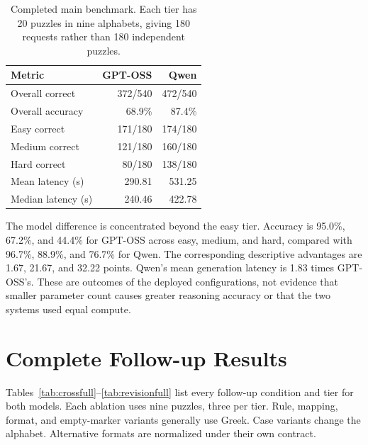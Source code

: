 \documentclass[11pt]{article}
\begin{document}
\begin{table}[t]
\centering\small
\begin{tabular}{lrr}
\toprule
Metric & GPT-OSS & Qwen\\
\midrule
Overall correct & 372/540 & 472/540\\
Overall accuracy & 68.9\% & 87.4\%\\
Easy correct & 171/180 & 174/180\\
Medium correct & 121/180 & 160/180\\
Hard correct & 80/180 & 138/180\\
Mean latency (s) & 290.81 & 531.25\\
Median latency (s) & 240.46 & 422.78\\
\bottomrule
\end{tabular}
\caption{Completed main benchmark. Each tier has 20 puzzles in nine alphabets, giving 180 requests rather than 180 independent puzzles.}
\label{tab:main}
\end{table}

The model difference is concentrated beyond the easy tier. Accuracy is 95.0\%, 67.2\%, and 44.4\% for GPT-OSS across easy, medium, and hard, compared with 96.7\%, 88.9\%, and 76.7\% for Qwen. The corresponding descriptive advantages are 1.67, 21.67, and 32.22 points. Qwen's mean generation latency is 1.83 times GPT-OSS's. These are outcomes of the deployed configurations, not evidence that smaller parameter count causes greater reasoning accuracy or that the two systems used equal compute.

\section{Complete Follow-up Results}\label{app:followups}
Tables~\ref{tab:crossfull}--\ref{tab:revisionfull} list every follow-up condition and tier for both models. Each ablation uses nine puzzles, three per tier. Rule, mapping, format, and empty-marker variants generally use Greek. Case variants change the alphabet. Alternative formats are normalized under their own contract.

\begin{table}[t]
\centering\footnotesize

\caption{All input/output conditions and difficulty counts. Control conditions do not require Sudoku solving. Each Sudoku tier has five puzzles per condition.}
\label{tab:crossfull}
\end{table}

\begin{table}[t]
\centering\footnotesize

\caption{All constructed token-length conditions. Labels differ between tokenizers. Each tier uses five puzzles per condition.}
\label{tab:tokenfull}
\end{table}
\end{document}
